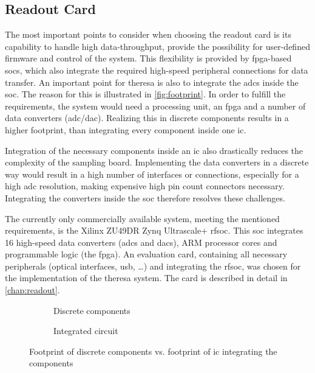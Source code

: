 \subsection{Readout Card}\label{sec:selection}
The most important points to consider when choosing the readout card is its capability to handle high data-throughput, provide the possibility for user-defined firmware and control of the system.
This flexibility is provided by \gls{fpga}-based \glspl{soc}, which also integrate the required high-speed peripheral connections for data transfer.
An important point for \gls{theresa} is also to integrate the \glspl{adc} inside the \gls{soc}. 
The reason for this is illustrated in \autoref{fig:footprint}. 
In order to fulfill the requirements, the system would need a processing unit, an \gls{fpga} and a number of data converters (\gls{adc}/\gls{dac}).
Realizing this in discrete components results in a higher footprint, than integrating every component inside one \gls{ic}.

Integration of the necessary components inside an \gls{ic} also drastically reduces the complexity of the sampling board.
Implementing the data converters in a discrete way would result in a high number of interfaces or connections, especially for a high \gls{adc} resolution,  making expensive high pin count connectors necessary.
Integrating the converters inside the \gls{soc} therefore resolves these challenges.

The currently only commercially available system, meeting the mentioned requirements, is the Xilinx ZU49DR Zynq Ultrascale+ \gls{rfsoc}.
This \gls{soc} integrates 16 high-speed data converters (\glspl{adc} and \glspl{dac}), ARM processor cores and programmable logic (the \gls{fpga}).
An evaluation card, containing all necessary peripherals (optical interfaces, \gls{usb}, \ldots) and integrating the \gls{rfsoc}, was chosen for the implementation of the \gls{theresa} system.
The card is described in detail in \autoref{chap:readout}.


\begin{figure}[H]
	\centering
	\begin{subfigure}{0.4\textwidth}
		\centering
		\caption{Discrete components}
		\label{fig:discreteComp}
	\end{subfigure}\hfill
	\begin{subfigure}{0.4\textwidth}
		\centering
		\caption{Integrated circuit}
		\label{fig:integratedComp}
	\end{subfigure}
	\caption[Discrete components vs. IC]{Footprint of discrete components vs. footprint of \gls{ic} integrating the components}
	\label{fig:footprint}
\end{figure}
